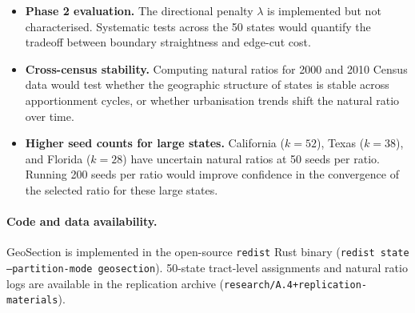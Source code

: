 \begin{itemize}
\item \textbf{Phase 2 evaluation.}
  The directional penalty $\lambda$ is implemented but not characterised.
  Systematic tests across the 50 states would quantify the tradeoff between
  boundary straightness and edge-cut cost.

\item \textbf{Cross-census stability.}
  Computing natural ratios for 2000 and 2010 Census data would test whether
  the geographic structure of states is stable across apportionment cycles,
  or whether urbanisation trends shift the natural ratio over time.

\item \textbf{Higher seed counts for large states.}
  California ($k=52$), Texas ($k=38$), and Florida ($k=28$) have uncertain
  natural ratios at 50 seeds per ratio.
  Running 200 seeds per ratio would improve confidence in the convergence
  of the selected ratio for these large states.
\end{itemize}

\paragraph{Code and data availability.}
GeoSection is implemented in the open-source \texttt{redist} Rust binary
(\texttt{redist state --partition-mode geosection}).
50-state tract-level assignments and natural ratio logs are available in the
replication archive (\texttt{research/A.4+replication-materials}).
